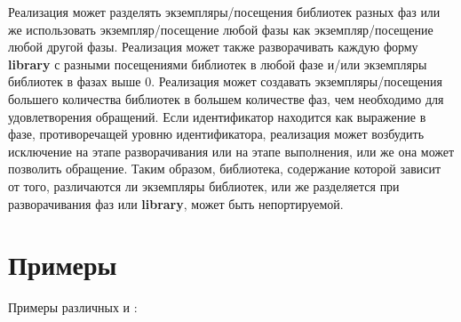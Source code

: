 Реализация может разделять экземпляры/посещения библиотек разных фаз или же
использовать экземпляр/посещение любой фазы как экземпляр/посещение любой другой
фазы. Реализация может также разворачивать каждую форму {\cf\bfseries library} с разными
посещениями библиотек в любой фазе и/или экземпляры библиотек в фазах выше $0$. Реализация
может создавать экземпляры/посещения большего количества библиотек в большем количестве фаз, чем
необходимо для удовлетворения обращений. Если идентификатор находится как выражение в фазе,
противоречащей уровню идентификатора, реализация может возбудить исключение на этапе разворачивания
или на этапе выполнения, или же она может позволить обращение. Таким образом, библиотека,
содержание которой зависит от того, различаются ли экземпляры библиотек, или же разделяется при
разворачивания фаз или {\cf\bfseries library}, может быть непортируемой.\vspace{-4mm}

\section{Примеры}

Примеры различных  и :

